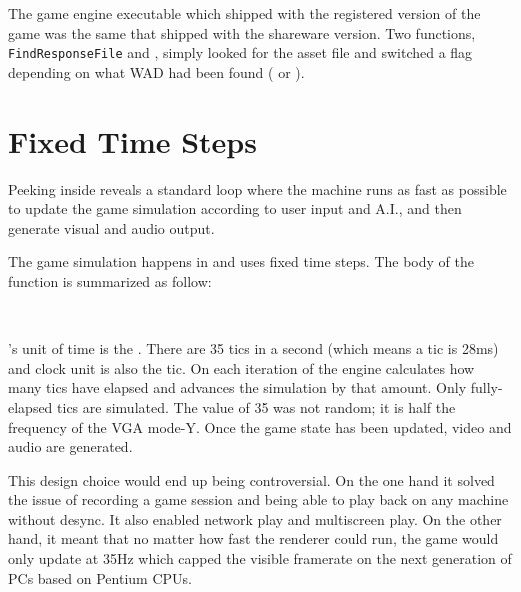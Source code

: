 \par
\vspace{-10pt}
The game engine executable which shipped with the registered version of the game was the same that shipped with the shareware version. Two functions, \texttt{\justify FindResponseFile} and , simply looked for the asset file and switched a flag depending on what WAD had been found ( or ).




\section{Fixed Time Steps}
Peeking inside  reveals a standard loop where the machine runs as fast as possible to update the game simulation according to user input and A.I., and then generate visual and audio output.\\
\par
{}
The game simulation happens in  and uses fixed time steps. The body of the function is summarized as follow:\\
\par
{}\label{TryRunTics.c}\\
\par
\doom's unit of time is the . There are 35 tics in a second (which means a tic is 28ms) and 
 clock unit is also the tic. On each iteration of  the engine calculates how many tics have elapsed and advances the simulation by that amount. Only fully-elapsed tics are simulated. The value of 35 was not random; it is half the frequency of the VGA mode-Y. Once the game state has been updated, video and audio are generated.\\
\par
{}
\par
This design choice would end up being controversial. On the one hand it solved the issue of recording a game session and being able to play back on any machine without desync. It also enabled network play and multiscreen play. On the other hand, it meant that no matter how fast the renderer could run, the game would only update at 35Hz which capped the visible framerate on the next generation of PCs based on Pentium CPUs.\\
\par



